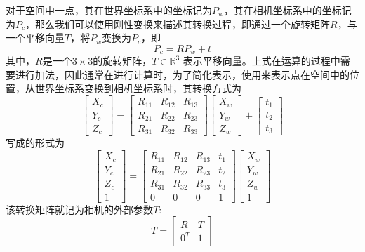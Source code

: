 对于空间中一点，其在世界坐标系中的坐标记为\(P_w\)，其在相机坐标系中的坐标记为\(P_c\)，那么我们可以使用刚性变换来描述其转换过程，即通过一个旋转矩阵\(R\)，与一个平移向量\(T\)，将\(P_w\)变换为\(P_c\)，即
\begin{equation}
    P_c = RP_w + t
\end{equation}
其中，\(R\)是一个\(3\times 3\)的旋转矩阵，\(T \in \mathbb{R}^{3}\) 表示平移向量。上式在运算的过程中需要进行加法，因此通常在进行计算时，为了简化表示，使用\qczb 来表示点在空间中的位置，从世界坐标系变换到相机坐标系时，其转换方式为
\begin{equation}
\left[\begin{array}{c}X_c\\Y_c\\Z_c\end{array}\right] = \left[\begin{array}{ccc}R_{11}&R_{12}&R_{13}\\R_{21}&R_{22}&R_{23}\\R_{31}&R_{32}&R_{33}\end{array}\right]\left[\begin{array}{c}X_w\\Y_w\\Z_w\end{array}\right] + \left[\begin{array}{c}t_1\\t_2\\t_3\end{array}\right]    
\end{equation}
写成\qczb 的形式为
\begin{equation}
\left[\begin{array}{c}X_c\\Y_c\\Z_c\\1 \end{array}\right] = 
\left[\begin{array}{cccc}R_{11}&R_{12}&R_{13}&t_1\\R_{21}&R_{22}&R_{23}&t_2\\R_{31}&R_{32}&R_{33}&t_3\\0&0&0&1\end{array}\right]
\left[\begin{array}{c}X_w\\Y_w\\Z_w\\1\end{array}\right]
\end{equation}
该转换矩阵就记为相机的外部参数\(T\):
\begin{equation}
    T = \left[\begin{array}{cc}R&T\\0^T&1\end{array}\right]
\end{equation}


